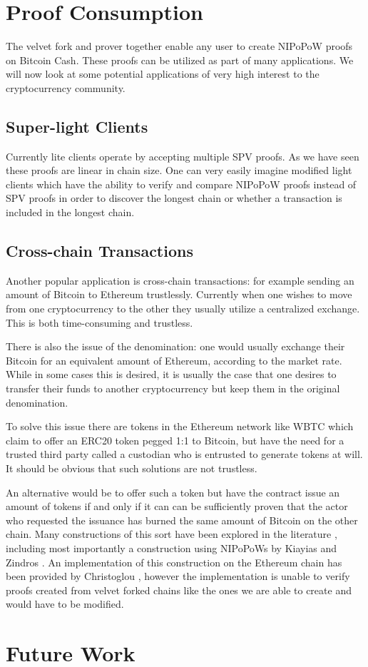 \section{Proof Consumption}
The velvet fork and prover together enable any user to create NIPoPoW proofs on Bitcoin Cash. These proofs can be utilized as part of many applications. We will now look at some potential applications of very high interest to the cryptocurrency community.

\subsection{Super-light Clients}
Currently lite clients operate by accepting multiple SPV proofs. As we have seen these proofs are linear in chain size. One can very easily imagine modified light clients which have the ability to verify and compare NIPoPoW proofs instead of SPV proofs in order to discover the longest chain or whether a transaction is included in the longest chain.

\subsection{Cross-chain Transactions}
Another popular application is cross-chain transactions: for example sending an amount of Bitcoin to Ethereum trustlessly. Currently when one wishes to move from one cryptocurrency to the other they usually utilize a centralized exchange. This is both time-consuming and trustless.

There is also the issue of the denomination: one would usually exchange their Bitcoin for an equivalent amount of Ethereum, according to the market rate. While in some cases this is desired, it is usually the case that one desires to transfer their funds to another cryptocurrency but keep them in the original denomination.

To solve this issue there are tokens in the Ethereum network like WBTC \cite{wbtc} which claim to offer an ERC20 token pegged 1:1 to Bitcoin, but have the need for a trusted third party called a custodian who is entrusted to generate tokens at will. It should be obvious that such solutions are not trustless.

An alternative would be to offer such a token but have the contract issue an amount of tokens if and only if it can can be sufficiently proven that the actor who requested the issuance has burned the same amount of Bitcoin on the other chain. Many constructions of this sort have been explored in the literature \cite{xclaim}, including most importantly a construction using NIPoPoWs by Kiayias and Zindros \cite{pow-sidechains}. An implementation of this construction on the Ethereum chain has been provided by Christoglou \cite{christoglou}, however the implementation is unable to verify proofs created from velvet forked chains like the ones we are able to create and would have to be modified.

\section{Future Work}
